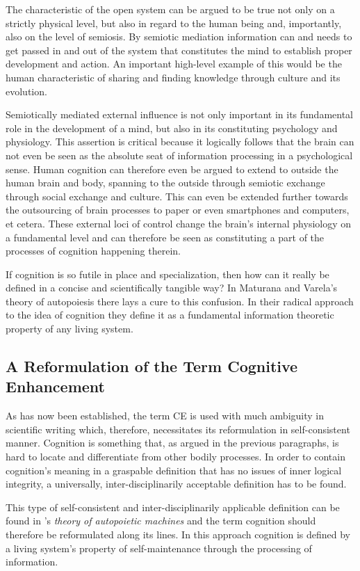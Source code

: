The characteristic of the open system can be argued to be true not only on a strictly physical level, but also in regard to the human being and, importantly, also on the level of semiosis. By semiotic mediation information can and needs to get passed in and out of the system that constitutes the mind to establish proper development and action. An important high-level example of this would be the human characteristic of sharing and finding knowledge through culture and its evolution.

Semiotically mediated external influence is not only important in its fundamental role in the development of a mind, but also in its constituting psychology and physiology. This assertion is critical because it logically follows that the brain can not even be seen as the absolute seat of information processing in a psychological sense. Human cognition can therefore even be argued to extend to outside the human brain and body, spanning to the outside through semiotic exchange through social exchange and culture. This can even be extended further towards the outsourcing of brain processes to paper or even smartphones and computers, et cetera. These external loci of control change the brain's internal physiology on a fundamental level and can therefore be seen as constituting a part of the processes of cognition happening therein.

If cognition is so futile in place and specialization, then how can it really be defined in a concise and scientifically tangible way? In Maturana and Varela’s theory of autopoiesis there lays a cure to this confusion. In their radical approach to the idea of cognition they define it as a fundamental information theoretic property of any living system. 

\subsection{A Reformulation of the Term Cognitive Enhancement}
As has now been established, the term CE is used with much ambiguity in scientific writing which, therefore, necessitates its reformulation in self-consistent manner. Cognition is something that, as argued in the previous paragraphs, is hard to locate and differentiate from other bodily processes. In order to contain cognition's meaning in a graspable definition that has no issues of inner logical integrity, a universally, inter-disciplinarily acceptable definition has to be found.

This type of self-consistent and inter-disciplinarily applicable definition can be found in \citeauthor{Maturana1980}’s \citeyearpar{Maturana1980} \emph{theory of autopoietic machines} and the term cognition should therefore be reformulated along its lines. In this approach cognition is defined by a living system's property of self-maintenance through the processing of information.


